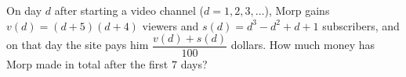 On day $d$ after starting a video channel ($d=1,2,3,\dots$), Morp gains $v(d)=(d+5)(d+4)$ viewers and $s(d)=d^3-d^2+d+1$ subscribers, and on that day the site pays him $\dfrac{v(d)+s(d)}{100}$ dollars. How much money has Morp made in total after the first $7$ days?
